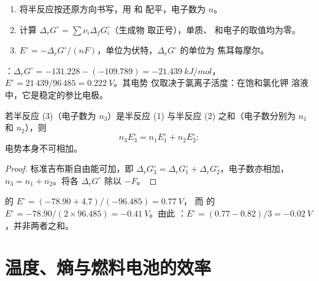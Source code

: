 \begin{method}[由数据表求标准电极电势]\label{met:b2:cell-thermodynamics:e-from-gibbs}
\begin{enumerate}
  \item 将半反应按还原方向书写，用  和
         配平，电子数为 $n$。
  \item 计算 $\Delta_r G^\circ = \sum\nu_i\Delta_f G^\circ_i$（生成物
        取正号），单质、 和电子的取值均为零。
  \item $E^\circ = -\Delta_r G^\circ/(nF)$，单位为伏特，$\Delta_r G^\circ$ 的单位为
        焦耳每摩尔。
\end{enumerate}
\end{method}

\begin{example}[氯化银电极]\label{ex:b2:cell-thermodynamics:agcl}
：$\Delta_r G^\circ = -131.228 - (-109.789) =
\qty{-21.439}{kJ/mol}$，$E^\circ = 21\,439/96\,485 = \qty{0.222}{V}$。其电势
仅取决于氯离子活度：在饱和氯化钾
溶液中，它是稳定的参比电极。
\end{example}

\begin{proposition}[电极电势的组合]\label{prop:b2:cell-thermodynamics:combining}
若半反应 (3)（电子数为 $n_3$）是半反应 (1)
与半反应 (2) 之和（电子数分别为 $n_1$ 和 $n_2$），则
\[
  n_3E_3^\circ = n_1E_1^\circ + n_2E_2^\circ ;
\]
电势本身不可相加。
\end{proposition}

\begin{proof}
标准吉布斯自由能可加，即 $\Delta_r G_3^\circ = \Delta_r G_1^\circ + \Delta_r
G_2^\circ$，电子数亦相加，$n_3 = n_1 + n_2$。将各 $\Delta_r
G^\circ$ 除以 $-F$。
\end{proof}

\begin{example}[铁的两种氧化态]\label{ex:b2:cell-thermodynamics:iron}
 的 $E^\circ = (-78.90 + 4.7)/(-96.485) = \qty{0.77}{V}$，
而  的 $E^\circ = -78.90/(2 \times 96.485) =
\qty{-0.41}{V}$。由此 ：$E^\circ = (0.77 - 0.82)/3 =
\qty{-0.02}{V}$，并非两者之和。
\end{example}

\section{温度、熵与燃料电池的效率}

